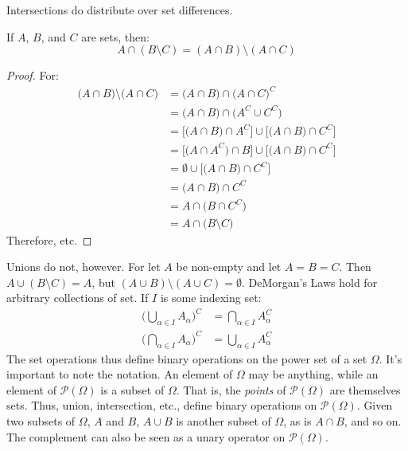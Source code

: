         Intersections do distribute over set differences.
        \begin{theorem}
            If $A$, $B$, and $C$ are sets, then:
            \begin{equation}
                A\cap(B\setminus{C})=
                (A\cap{B})\setminus(A\cap{C})
            \end{equation}
        \end{theorem}
        \begin{proof}
            For:
            \begin{subequations}
                \begin{align}
                    \big(A\cap{B}\big)\setminus
                        \big(A\cap{C}\big)
                    &=\big(A\cap{B}\big)
                        \cap\big(A\cap{C}\big)^{C}\\
                    &=\big(A\cap{B}\big)
                        \cap\big(A^{C}\cup{C}^{C}\big)\\
                    &=\big[\big(A\cap{B}\big)\cap{A}^{C}\big]
                        \cup\big[\big({A}\cap{B}\big)
                        \cap{C}^{C}\big]\\
                    &=\big[\big(A\cap{A}^{C}\big)\cap{B}\big]
                        \cup\big[\big(A\cap{B}\big)
                        \cap{C}^{C}\big]\\
                    &=\emptyset\cup\big[\big(A\cap{B}\big)
                        \cap{C}^{C}\big]\\
                    &=\big(A\cap{B}\big)\cap{C}^{C}\\
                    &=A\cap\big(B\cap{C}^{C}\big)\\
                    &=A\cap\big(B\setminus{C}\big)
                \end{align}
            \end{subequations}
            Therefore, etc.
        \end{proof}
        Unions do not, however. For let $A$ be non-empty
        and let $A=B=C$. Then $A\cup(B\setminus{C})=A$, but
        $(A\cup{B})\setminus(A\cup{C})=\emptyset$.
        DeMorgan's Laws hold for arbitrary collections
        of set. If $I$ is some indexing set:
        \begin{align}
            \Big(\bigcup_{\alpha\in{I}}A_{\alpha}\Big)^{C}
            &=\bigcap_{\alpha\in{I}}A_{\alpha}^{C}\\
            \Big(\bigcap_{\alpha\in{I}}A_{\alpha}\Big)^{C}
            &=\bigcup_{\alpha\in{I}}A_{\alpha}^{C}
        \end{align}
        The set operations thus define binary operations
        on the power set of a set $\Omega$. It's important
        to note the notation. An element of $\Omega$ may
        be anything, while an element of
        $\mathcal{P}(\Omega)$ is a subset of $\Omega$.
        That is, the \textit{points} of $\mathcal{P}(\Omega)$
        are themselves sets. Thus, union, intersection,
        etc., define binary operations on
        $\mathcal{P}(\Omega)$. Given two subsets of
        $\Omega$, $A$ and $B$, $A\cup{B}$ is another
        subset of $\Omega$, as is $A\cap{B}$, and so on.
        The complement can also be seen as a unary operator
        on $\mathcal{P}(\Omega)$.
